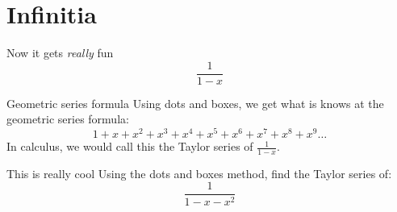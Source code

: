 \section{Infinitia}
\begin{namedframe}{Now it gets \emph{really} fun}
	\Huge
	\[\frac{1}{1-x}\]
\end{namedframe}
\begin{namedframe}{Geometric series formula}
	Using dots and boxes, we get what is knows at the \alert{geometric series formula}:
	\pause
	\[1 + x + x^2 + x^3 + x^4 + x^5 + x^6 + x^7 + x^8 + x^9 \dots\]
	\pause
	In calculus, we would call this the \alert{Taylor series} of $\frac{1}{1-x}$.
\end{namedframe}
\begin{namedframe}{This is really cool}
	Using the dots and boxes method, find the Taylor series of:
	\Huge
	\[\frac{1}{1-x-x^2}\]
\end{namedframe}
